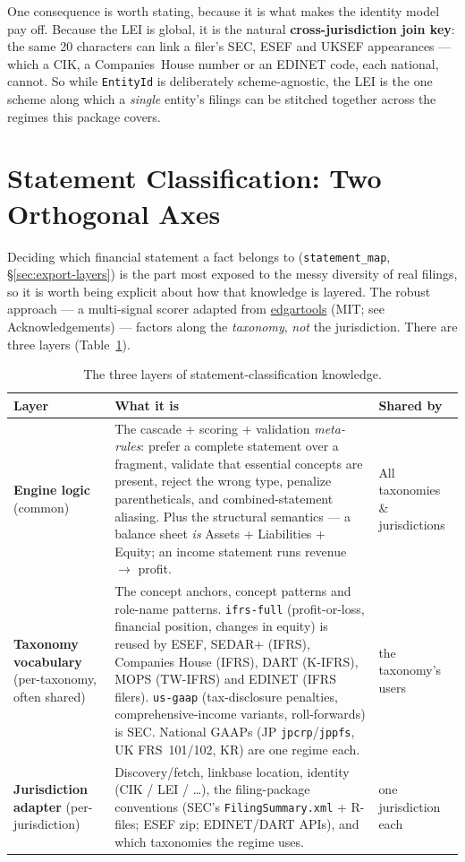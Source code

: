 \documentclass[11pt,a4paper]{report}
\begin{document}
\noindent One consequence is worth stating, because it is what makes the identity model pay off. Because the
LEI is global, it is the natural \textbf{cross-jurisdiction join key}: the same 20 characters can link a filer's
SEC, ESEF and UKSEF appearances --- which a CIK, a Companies~House number or an EDINET code, each national,
cannot. So while \texttt{EntityId} is deliberately scheme-agnostic, the LEI is the one scheme along which a
\emph{single} entity's filings can be stitched together across the regimes this package covers.

\section{Statement Classification: Two Orthogonal Axes}
\label{sec:two-axes}
\label{sec:classification-layers}

Deciding which financial statement a fact belongs to (\texttt{statement\_map}, \S\ref{sec:export-layers})
is the part most exposed to the messy diversity of real filings, so it is worth being explicit about
how that knowledge is layered. The robust approach --- a multi-signal scorer adapted from
\href{https://github.com/dgunning/edgartools}{edgartools} (MIT; see Acknowledgements) --- factors
along the \emph{taxonomy}, \emph{not} the jurisdiction. There are three layers
(Table~\ref{tab:classify-layers}).

\begin{table}[h]
\centering
\caption{The three layers of statement-classification knowledge.}
\label{tab:classify-layers}
\small
\begin{tabular}{@{}p{}p{}p{}@{}}
\toprule
\textbf{Layer} & \textbf{What it is} & \textbf{Shared by} \\
\midrule
\textbf{Engine logic} (common) & The cascade + scoring + validation \emph{meta-rules}: prefer a complete statement over a fragment, validate that essential concepts are present, reject the wrong type, penalize parentheticals, and combined-statement aliasing. Plus the structural semantics --- a balance sheet \emph{is} Assets + Liabilities + Equity; an income statement runs revenue $\to$ profit. & All taxonomies \& jurisdictions \\
\textbf{Taxonomy vocabulary} (per-taxonomy, often shared) & The concept anchors, concept patterns and role-name patterns. \texttt{ifrs-full} (profit-or-loss, financial position, changes in equity) is reused by ESEF, SEDAR+ (IFRS), Companies House (IFRS), DART (K-IFRS), MOPS (TW-IFRS) and EDINET (IFRS filers). \texttt{us-gaap} (tax-disclosure penalties, comprehensive-income variants, roll-forwards) is SEC. National GAAPs (JP \texttt{jpcrp}/\texttt{jppfs}, UK FRS~101/102, KR) are one regime each. & the taxonomy's users \\
\textbf{Jurisdiction adapter} (per-jurisdiction) & Discovery/fetch, linkbase location, identity (CIK / LEI / \ldots), the filing-package conventions (SEC's \texttt{FilingSummary.xml} + R-files; ESEF zip; EDINET/DART APIs), and which taxonomies the regime uses. & one jurisdiction each \\
\bottomrule
\end{tabular}
\end{table}
\end{document}
